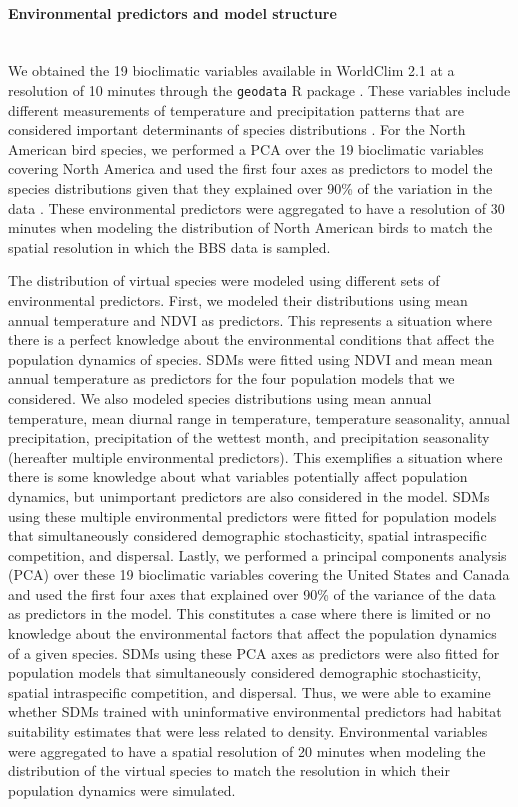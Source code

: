 \paragraph*{Environmental predictors and model structure}\mbox{}\\
We obtained the 19 bioclimatic variables available in WorldClim 2.1 at a resolution of 10 minutes through the \texttt{geodata} R package \parencite{fick2017, geodata}. These variables include different measurements of temperature and precipitation patterns that are considered important determinants of species distributions \parencite{barbet2014, illan2014}. For the North American bird species, we performed a PCA over the 19 bioclimatic variables covering North America and used the first four axes as predictors to model the species distributions given that they explained over 90\% of the variation in the data \parencite{kriticos2014}. These environmental predictors were aggregated to have a resolution of 30 minutes when modeling the distribution of North American birds to match the spatial resolution in which the BBS data is sampled.  

The distribution of virtual species were modeled using different sets of environmental predictors. First, we modeled their distributions using mean annual temperature and NDVI as predictors. This represents a situation where there is a perfect knowledge about the environmental conditions that affect the population dynamics of species. SDMs were fitted using NDVI and mean mean annual temperature as predictors for the four population models that we considered. We also modeled species distributions using mean annual temperature, mean diurnal range in temperature, temperature seasonality, annual precipitation, precipitation of the wettest month, and precipitation seasonality (hereafter multiple environmental predictors). This exemplifies a situation where there is some knowledge about what variables potentially affect population dynamics, but unimportant predictors are also considered in the model. SDMs using these multiple environmental predictors were fitted for population models that simultaneously considered demographic stochasticity, spatial intraspecific competition, and dispersal. Lastly, we performed a principal components analysis (PCA) over these 19 bioclimatic variables covering the United States and Canada and used the first four axes that explained over 90\% of the variance of the data as predictors in the model. This constitutes a case where there is limited or no knowledge about the environmental factors that affect the population dynamics of a given species. SDMs using these PCA axes as predictors were also fitted for population models that simultaneously considered demographic stochasticity, spatial intraspecific competition, and dispersal. Thus, we were able to examine whether SDMs trained with uninformative environmental predictors had habitat suitability estimates that were less related to density. Environmental variables were aggregated to have a spatial resolution of 20 minutes when modeling the distribution of the virtual species to match the resolution in which their population dynamics were simulated. 

